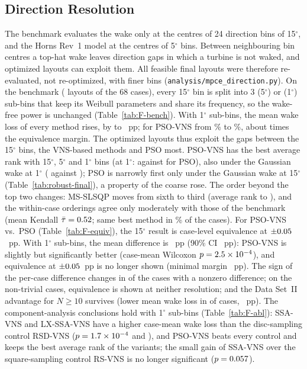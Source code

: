 \documentclass[10pt]{article}
\begin{document}
\subsection{Direction Resolution}
\label{sec:S-direction}
The benchmark evaluates the wake only at the centres of 24 direction bins of 15$^\circ$, and the Horns Rev~1 model at the centres of 5$^\circ$ bins. Between neighbouring bin centres a top-hat wake leaves direction gaps in which a turbine is not waked, and optimized layouts can exploit them. All feasible final layouts were therefore re-evaluated, not re-optimized, with finer bins (\texttt{analysis/mpce\_direction.py}). On the benchmark (\NFNLayouts{} layouts of the 68 cases), every 15$^\circ$ bin is split into 3 (5$^\circ$) or \NFSubBins{} (1$^\circ$) sub-bins that keep its Weibull parameters and share its frequency, so the wake-free power is unchanged (Table~\ref{tab:F-bench}). With 1$^\circ$ sub-bins, the mean wake loss of every method rises, by \NFLossRiseMin{} to \NFLossRiseMax~pp; for PSO-VNS from \NFLossPSOVNSFifteen\% to \NFLossPSOVNSOne\%, about \NFLossRiseMarginRatio{} times the equivalence margin. The optimized layouts thus exploit the gaps between the 15$^\circ$ bins, the VNS-based methods and PSO most. %
 PSO-VNS has the best average rank with 15$^\circ$, 5$^\circ$ and 1$^\circ$ bins (at 1$^\circ$: \NFRankPSOVNSOne{} against \NFRankPSOOne{} for PSO), also under the Gaussian wake at 1$^\circ$ (\NFGaussOneRankPSOVNS{} against \NFGaussOneRankPSO); PSO is narrowly first only under the Gaussian wake at 15$^\circ$ (Table~\ref{tab:robust-final}), a property of the coarse rose. The order beyond the top two changes: MS-SLSQP moves from sixth to third (average rank \NFRankMSSLSQPFifteen{} to \NFRankMSSLSQPOne), and the within-case orderings agree only moderately with those of the benchmark (mean Kendall $\bar\tau=0.52$; same best method in \NFSameBestOne\% of the cases). %
 For PSO-VNS vs.\ PSO (Table~\ref{tab:F-equiv}), the 15$^\circ$ result is case-level equivalence at $\pm0.05$~pp. With 1$^\circ$ sub-bins, the mean difference is \NFPairMeanOne~pp (90\% CI \NFPairCIOne~pp): PSO-VNS is slightly but significantly better (case-mean Wilcoxon $p=2.5\times10^{-4}$), and equivalence at $\pm0.05$~pp is no longer shown (minimal margin \NFPairMinMarginOne~pp). The sign of the per-case difference changes in \NFSignChangesOne{} of the \NFSignChangesBase{} cases with a nonzero difference; on the \NFNonTrivN{} non-trivial cases, equivalence is shown at neither resolution; and the Data Set~II advantage for $N\ge10$ survives (lower mean wake loss in \NFDSIINTenWinsOne{} of \NFDSIINTenN{} cases, \NFDSIINTenMeanOne~pp). %
 The component-analysis conclusions hold with 1$^\circ$ sub-bins (Table~\ref{tab:F-abl}): SSA-VNS and LX-SSA-VNS have a higher case-mean wake loss than the disc-sampling control RSD-VNS ($p=1.7\times10^{-4}$ and \NFAblLXSSAVNSvsRSDVNSOneP), and PSO-VNS beats every control and keeps the best average rank of the \NAblNVar{} variants; the small gain of SSA-VNS over the square-sampling control RS-VNS is no longer significant ($p=0.057$). %
\end{document}
